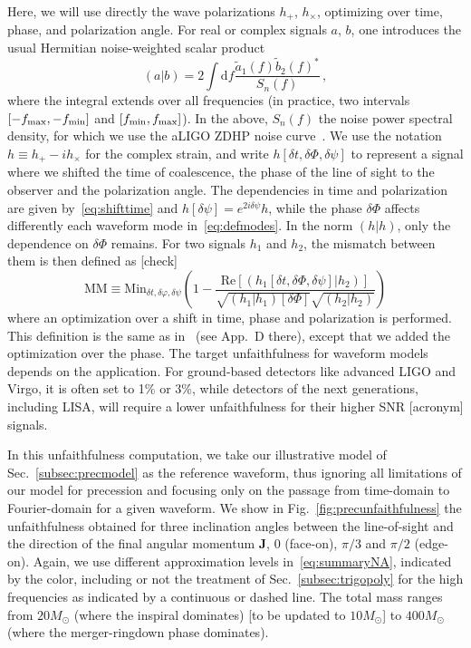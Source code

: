 \documentclass[aps,showpacs,twocolumn,
prd,superscriptaddress,nofootinbib]{revtex4-1}
\newcommand{\be}{\begin{equation}}
\newcommand{\ee}{\end{equation}}
\newcommand\ud{{\mathrm{d}}}
\newcommand{\Msol}{M_{\odot}}
\newcommand{\SM}[1]{{\color{Red} #1}}
\begin{document}
Here, we will use directly the wave polarizations $h_{+}$, $h_{\times}$, optimizing over time, phase, and polarization angle. For real or complex signals $a$, $b$, one introduces the usual Hermitian noise-weighted scalar product~\cite{CF94}
\be\label{eq:defoverlap}
	\left( a | b \right) = 2 \int \ud f \frac{\tilde{a}_{1}(f) \tilde{b}_{2}(f)^{*}}{S_{n}(f)} \,,
\ee
where the integral extends over all frequencies (in practice, two intervals $[-f_{\rm max}, -f_{\rm min}]$ and $[f_{\rm min}, f_{\rm max}]$). In the above, $S_{n}(f)$ the noise power spectral density, for which we use the aLIGO ZDHP noise curve~\cite{LIGOProspects13}. We use the notation $h \equiv h_{+} - i h_{\times}$ for the complex strain, and write $h[\delta t, \delta \Phi, \delta \psi]$ to represent a signal where we shifted the time of coalescence, the phase of the line of sight to the observer and the polarization angle. The dependencies in time and polarization are given by~\eqref{eq:shifttime} and $h[\delta \psi] = e^{2 i \delta \psi} h$, while the phase $\delta \Phi$ affects differently each waveform mode in~\eqref{eq:defmodes}. In the norm $(h|h)$, only the dependence on $\delta\Phi$ remains. For two signals $h_{1}$ and $h_{2}$, the mismatch between them is then defined as \SM{[check]}
\be\label{eq:defMM}
	\mathrm{MM} \equiv \mathrm{Min}_{\delta t, \delta \varphi, \delta \psi} \left( 1 - \frac{ \mathrm{Re} \left[ (h_{1}[\delta t, \delta \Phi, \delta \psi] | h_{2}) \right]}{\sqrt{(h_{1}|h_{1})[\delta\Phi]}\sqrt{(h_{2}|h_{2})}} \right)
\ee
where an optimization over a shift in time, phase and polarization is performed. This definition is the same as in~\cite{Blackman+17a} (see App.~D there), except that we added the optimization over the phase. The target unfaithfulness for waveform models depends on the application. For ground-based detectors like advanced LIGO and Virgo, it is often set to 1\% or 3\%, while detectors of the next generations, including LISA, will require a lower unfaithfulness for their higher SNR \SM{[acronym]} signals.

In this unfaithfulness computation, we take our illustrative model of Sec.~\ref{subsec:precmodel} as the reference waveform, thus ignoring all limitations of our model for precession and focusing only on the passage from time-domain to Fourier-domain for a given waveform. We show in Fig.~\ref{fig:precunfaithfulness} the unfaithfulness obtained for three inclination angles between the line-of-sight and the direction of the final angular momentum $\bm{J}$, $0$ (face-on), $\pi/3$ and $\pi/2$ (edge-on). Again, we use different approximation levels in~\eqref{eq:summaryNA}, indicated by the color, including or not the treatment of Sec.~\ref{subsec:trigopoly} for the high frequencies as indicated by a continuous or dashed line. The total mass ranges from $20\Msol$ (where the inspiral dominates) \SM{[to be updated to $10 \Msol$]} to $400\Msol$ (where the merger-ringdown phase dominates).
\end{document}
